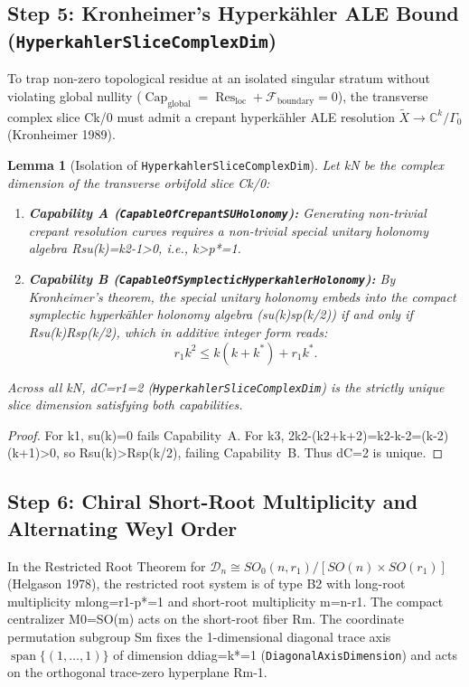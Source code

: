 \documentclass[11pt,reqno]{amsart}
\newtheorem{lemma}[theorem]{Lemma}
\theoremstyle{definition}
\theoremstyle{remark}
\newcommand{\CapGlobal}{\operatorname{Cap}_{\mathrm{global}}}
\newcommand{\ResLoc}{\operatorname{Res}_{\mathrm{loc}}}
\newcommand{\FluxBdy}{\mathcal{F}_{\mathrm{boundary}}}
\newcommand{\Span}{\operatorname{span}}
\begin{document}
\subsection{Step 5: Kronheimer's Hyperk\"ahler ALE Bound (\texttt{HyperkahlerSliceComplexDim})}

To trap non-zero topological residue at an isolated singular stratum without violating global nullity ($\CapGlobal = \ResLoc + \FluxBdy = 0$), the transverse complex slice Ck/0 must admit a crepant hyperk\"ahler ALE resolution $\widetilde{X} \to \mathbb{C}^k / \Gamma_0$ (Kronheimer 1989).

\begin{lemma}[Isolation of \texttt{HyperkahlerSliceComplexDim}]
\label{lem:hyperkahler_slice}
Let kN be the complex dimension of the transverse orbifold slice Ck/0:
\begin{enumerate}[label=(\alph*)]
  \item \textbf{Capability A (\texttt{CapableOfCrepantSUHolonomy}):} Generating non-trivial crepant resolution curves requires a non-trivial special unitary holonomy algebra Rsu(k)=k2-1>0, i.e., k>p*=1.
  \item \textbf{Capability B (\texttt{CapableOfSymplecticHyperkahlerHolonomy}):} By Kronheimer's theorem, the special unitary holonomy embeds into the compact symplectic hyperk\"ahler holonomy algebra (su(k)sp(k/2)) if and only if Rsu(k)Rsp(k/2), which in additive integer form reads:
  \begin{equation}
    r_1 k^2 \le k(k + k^*) + r_1 k^*.
  \end{equation}
\end{enumerate}
Across all kN, dC=r1=2 (\texttt{HyperkahlerSliceComplexDim}) is the strictly unique slice dimension satisfying both capabilities.
\end{lemma}
\begin{proof}
For k1, su(k)={0} fails Capability~A. For k3, 2k2-(k2+k+2)=k2-k-2=(k-2)(k+1)>0, so Rsu(k)>Rsp(k/2), failing Capability~B. Thus dC=2 is unique.
\end{proof}

\subsection{Step 6: Chiral Short-Root Multiplicity and Alternating Weyl Order}

In the Restricted Root Theorem for $\mathcal{D}_n \cong SO_0(n, r_1)/[SO(n)\times SO(r_1)]$ (Helgason 1978), the restricted root system is of type B2 with long-root multiplicity mlong=r1-p*=1 and short-root multiplicity m=n-r1. The compact centralizer M0=SO(m) acts on the short-root fiber Rm. The coordinate permutation subgroup Sm fixes the 1-dimensional diagonal trace axis $\Span\{(1,\dots,1)\}$ of dimension ddiag=k*=1 (\texttt{DiagonalAxisDimension}) and acts on the orthogonal trace-zero hyperplane Rm-1.
\end{document}

